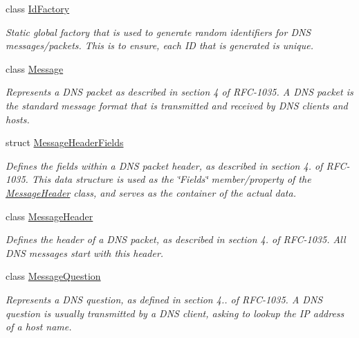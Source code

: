 \begin{DoxyCompactItemize}
\item 
class \hyperlink{class_senergy_1_1_dns_1_1_id_factory}{Id\-Factory}
\begin{DoxyCompactList}\small\item\em Static global factory that is used to generate random identifiers for D\-N\-S messages/packets. This is to ensure, each I\-D that is generated is unique. \end{DoxyCompactList}\item 
class \hyperlink{class_senergy_1_1_dns_1_1_message}{Message}
\begin{DoxyCompactList}\small\item\em Represents a D\-N\-S packet as described in section 4 of R\-F\-C-\/1035. A D\-N\-S packet is the standard message format that is transmitted and received by D\-N\-S clients and hosts. \end{DoxyCompactList}\item 
struct \hyperlink{struct_senergy_1_1_dns_1_1_message_header_fields}{Message\-Header\-Fields}
\begin{DoxyCompactList}\small\item\em Defines the fields within a D\-N\-S packet header, as described in section 4. of R\-F\-C-\/1035. This data structure is used as the \char`\"{}\-Fields\char`\"{} member/property of the \hyperlink{class_senergy_1_1_dns_1_1_message_header}{Message\-Header} class, and serves as the container of the actual data. \end{DoxyCompactList}\item 
class \hyperlink{class_senergy_1_1_dns_1_1_message_header}{Message\-Header}
\begin{DoxyCompactList}\small\item\em Defines the header of a D\-N\-S packet, as described in section 4. of R\-F\-C-\/1035. All D\-N\-S messages start with this header. \end{DoxyCompactList}\item 
class \hyperlink{class_senergy_1_1_dns_1_1_message_question}{Message\-Question}
\begin{DoxyCompactList}\small\item\em Represents a D\-N\-S question, as defined in section 4.. of R\-F\-C-\/1035. A D\-N\-S question is usually transmitted by a D\-N\-S client, asking to lookup the I\-P address of a host name. \end{DoxyCompactList}\item 

\end{DoxyCompactItemize}
